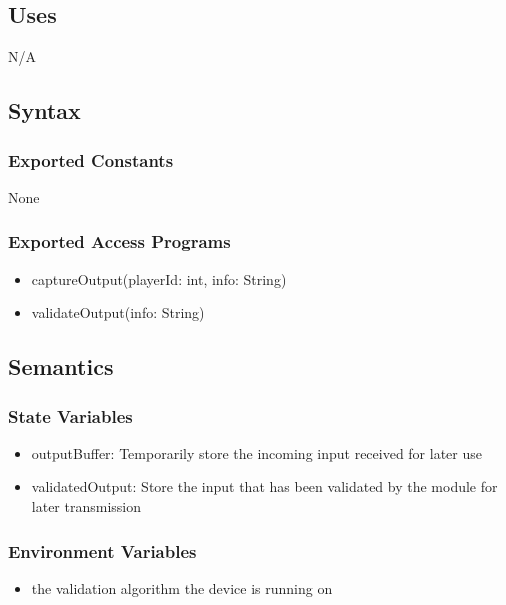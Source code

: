 \documentclass[12pt, titlepage]{article}
\begin{document}
\subsection{Uses}
\hspace{1.5em}N/A

\subsection{Syntax}

\subsubsection{Exported Constants}
\hspace{1.5em}None

\subsubsection{Exported Access Programs}

\begin{itemize}
\item captureOutput(playerId: int, info: String)
\item validateOutput(info: String)
\end{itemize}

\subsection{Semantics}

\subsubsection{State Variables}
\begin{itemize}
\item outputBuffer: Temporarily store the incoming input received for later use
\item validatedOutput: Store the input that has been validated by the module for later transmission
\end{itemize}

\subsubsection{Environment Variables}
\begin{itemize}
\item the validation algorithm the device is running on
\end{itemize}
\end{document}
